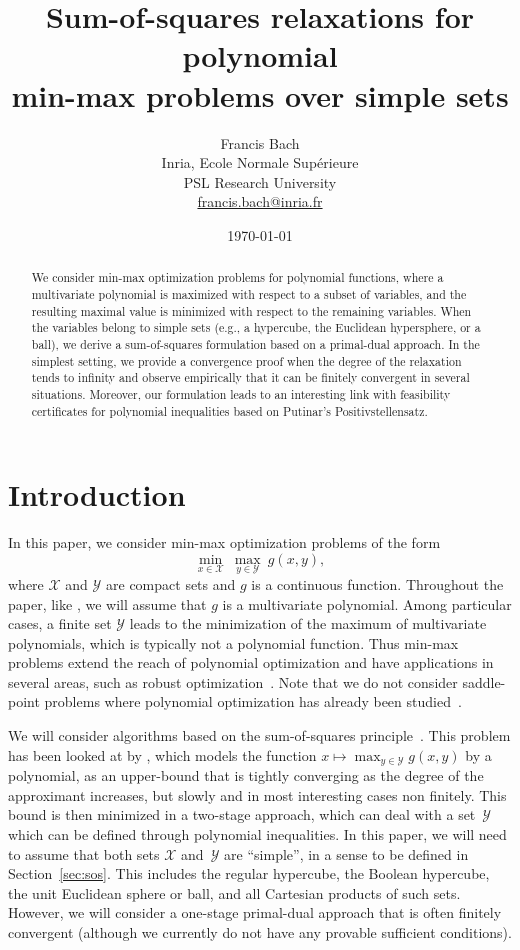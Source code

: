 \documentclass[11pt]{article}
\title{Sum-of-squares relaxations for polynomial \\
min-max problems over simple sets}
\author{Francis Bach\\
Inria,  Ecole Normale Sup\'erieure \\
PSL Research University \\
{\small \url{francis.bach@inria.fr}}}
\date{\today}
\newcommand{\BEQ}{\begin{equation}}
\newcommand{\EEQ}{\end{equation}}
\newcommand{\mysec}[1]{Section~\ref{sec:#1}}
\def \X{{\mathcal X}}
\def \Y{{\mathcal Y}}
\begin{document}
\maketitle

   \begin{abstract}
   We consider min-max optimization problems for polynomial functions, where a multivariate polynomial is maximized with respect to a subset of variables, and the resulting maximal value is minimized with respect to the remaining variables. When the variables belong to simple sets (e.g., a hypercube, the Euclidean hypersphere, or a ball), we derive a sum-of-squares formulation based on a primal-dual approach. In the simplest setting, we provide a convergence proof when the degree of the relaxation tends to infinity and observe empirically that it can be finitely convergent in several situations. Moreover, our formulation leads to an interesting link with feasibility certificates for polynomial inequalities based on Putinar's Positivstellensatz.
    \end{abstract}
   
 \section{Introduction}
 In this paper, we consider min-max optimization problems of the form
\BEQ 
\label{eq:minmax} \min_{x \in \X}\   \max_{y \in \Y} \ g(x,y),
\EEQ
where $\X$ and $\Y$ are compact sets and $g$ is a continuous function. Throughout the paper, like \cite{lasserre2011min}, we will assume that $g$ is a multivariate polynomial. Among particular cases, a finite set $\Y$ leads to the minimization of the maximum of multivariate polynomials, which is typically not a polynomial function. Thus min-max problems extend the reach of polynomial optimization and have applications in several areas, such as robust optimization~\cite{ben2009robust}. Note that we do not consider saddle-point problems where polynomial optimization has already been studied~\cite{nie2021saddle}.


We will consider algorithms based on the sum-of-squares principle~\cite{lasserre2001global,parrilo2003semidefinite}. This problem has been looked at by \cite{lasserre2011min}, which models the function $x \mapsto \max_{y \in \Y} g(x,y)$ by a polynomial, as an upper-bound that is tightly converging as the degree of the approximant increases, but slowly and in most interesting cases non finitely. This bound is then minimized in a two-stage approach, which can deal with a set~$\Y$ which can be defined through polynomial inequalities. In this paper, we will need to assume that both sets $\X$ and~$\Y$ are ``simple'', in a sense to be defined in \mysec{sos}. This includes the regular hypercube, the Boolean hypercube, the unit Euclidean sphere or ball, and all Cartesian products of such sets. However, we will consider a one-stage primal-dual approach that is often finitely convergent (although we currently do not have any provable sufficient conditions).
\end{document}
